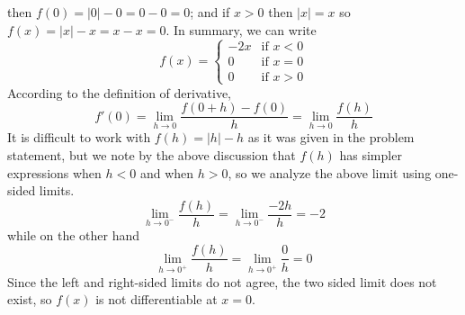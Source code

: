 \documentclass{article}
\begin{document}
\begin{enumerate}
  then $f(0)=|0|-0=0-0=0$; and if $x>0$ then $|x|=x$ so
  $f(x)=|x|-x=x-x=0$.  In summary, we can write
  \begin{equation*}
    f(x) = \begin{cases} 
      -2x & \mbox{if $x<0$} \\
      0   & \mbox{if $x=0$} \\
      0   & \mbox{if $x>0$}
    \end{cases}
  \end{equation*}
  According to the definition of derivative,
  \begin{equation*}
    f'(0) = \lim_{h\to 0} \frac{f(0+h)-f(0)}{h}
    = \lim_{h\to 0} \frac{f(h)}{h}
  \end{equation*}
  It is difficult to work with $f(h)=|h|-h$ as it was given in the
  problem statement, but we note by the above discussion that $f(h)$
  has simpler expressions when $h<0$ and when $h>0$, so we analyze the
  above limit using one-sided limits.
  \begin{equation*}
    \lim_{h\to 0^-} \frac{f(h)}{h} = 
    \lim_{h\to 0^-} \frac{-2h}{h} = -2
  \end{equation*}
  while on the other hand
  \begin{equation*}
    \lim_{h\to 0^+} \frac{f(h)}{h} = 
    \lim_{h\to 0^+} \frac{0}{h} = 0
  \end{equation*}
  Since the left and right-sided limits do not agree, the two sided
  limit does not exist, so $f(x)$ is not differentiable at $x=0$.


\end{enumerate}
\end{document}
